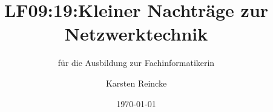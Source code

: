\documentclass[]{beamer}
\title{LF09:19:Kleiner Nachträge zur Netzwerktechnik}
\subtitle{für die Ausbildung zur Fachinformatikerin}
\institute[GS-LDK]{Gewerbliche Schulen Dillenburg}
\author{Karsten Reincke}
\date{\today}
\def\cfgGl{../../../cfg.gl/}
\begin{document}

\begin{frame}
  \titlepage

  
\end{frame}






\logo{}
\newpage



%
\end{document}
